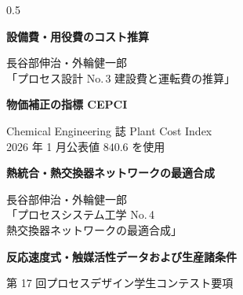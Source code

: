 \begin{frame}[t]
\begin{columns}[T,onlytextwidth]
\begin{column}{0.5\textwidth}
{        \vspace{0.6em}
        \textbf{設備費・用役費のコスト推算}\par
        長谷部伸治・外輪健一郎\\
        「プロセス設計 No.\,3 建設費と運転費の推算」\par
        \vspace{0.6em}
        \textbf{物価補正の指標 CEPCI}\par
        Chemical Engineering 誌 Plant Cost Index\\
        2026 年 1 月公表値 $840.6$ を使用\par
        \vspace{0.6em}
        \textbf{熱統合・熱交換器ネットワークの最適合成}\par
        長谷部伸治・外輪健一郎\\
        「プロセスシステム工学 No.\,4\\熱交換器ネットワークの最適合成」\par
        \vspace{0.6em}
        \textbf{反応速度式・触媒活性データおよび生産諸条件}\par
        第 17 回プロセスデザイン学生コンテスト要項\par
      }
    \end{column}
  \end{columns}

  \vfill

\end{frame}
